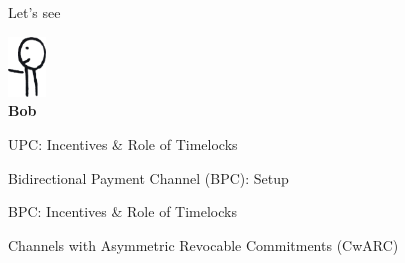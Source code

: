 \documentclass[]{beamer}
\begin{document}
\begin{frame}{Let's see}
\begin{minipage}{0.8\linewidth}
\begin{figure}
		\end{figure}
		\vspace{-2.9cm}
	\end{minipage}%
	\begin{minipage}{0.1\linewidth}
		\vspace{1.44cm}
		\centering
		\includegraphics[width=1cm]{../assets/images/agents/handing_left}
		\\ \hspace{0.3cm}\textbf{Bob}
		\vspace{-0.5cm}
		\begin{figure}
		\hspace{-1.7cm}
		\resizebox{2.5cm}{!}{
				\begin{tikzpicture}[scale=0.9, every node/.style={scale=0.9}]
					
				\end{tikzpicture}}
		\end{figure}
	\end{minipage}
\end{frame}

\begin{frame}{UPC: Incentives & Role of Timelocks}


\end{frame}


\begin{frame}{Bidirectional Payment Channel (BPC): Setup}




\end{frame}


\begin{frame}{BPC: Incentives & Role of Timelocks}


\end{frame}


\begin{frame}{Channels with Asymmetric Revocable Commitments (CwARC)}


\end{frame}
\end{document}
